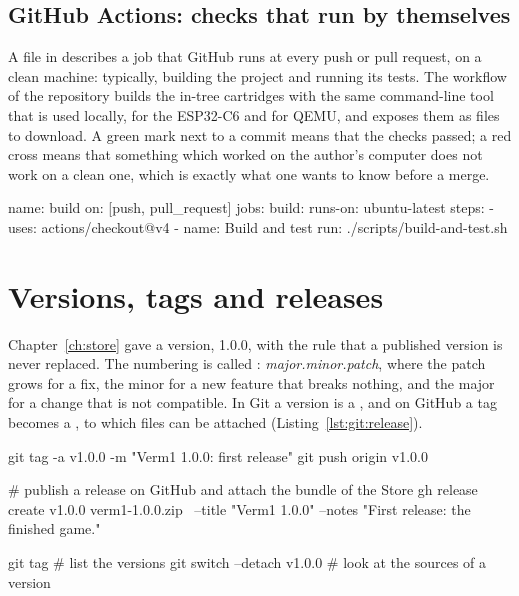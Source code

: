 \subsection{GitHub Actions: checks that run by themselves}

A file in  describes a job that GitHub runs at every
push or pull request, on a clean machine: typically, building the project and
running its tests. The workflow of the \prg repository builds the in-tree
cartridges with the same command-line tool that is used locally, for the
ESP32-C6 and for QEMU, and exposes them as files to download. A green mark
next to a commit means that the checks passed; a red cross means that
something which worked on the author's computer does not work on a clean one,
which is exactly what one wants to know before a merge.

\begin{plain}[caption={The outline of a workflow file (YAML). The build step is
project-specific: for a cartridge it requires the ESP-IDF toolchain.},label=lst:git:actions]
name: build
on: [push, pull_request]
jobs:
  build:
    runs-on: ubuntu-latest
    steps:
      - uses: actions/checkout@v4
      - name: Build and test
        run: ./scripts/build-and-test.sh
\end{plain}

\section{Versions, tags and releases}\label{sec:git:release}

Chapter~\ref{ch:store} gave \vermone a version, 1.0.0, with the rule that a
published version is never replaced. The numbering is called : \emph{major.minor.patch}, where the patch grows for a fix, the
minor for a new feature that breaks nothing, and the major for a change that
is not compatible. In Git a version is a , and on GitHub a tag
becomes a , to which files can be attached
(Listing~\ref{lst:git:release}).

\begin{shell}[caption={Tagging version 1.0.0 and releasing the bundle.},label=lst:git:release]
git tag -a v1.0.0 -m "Verm1 1.0.0: first release"
git push origin v1.0.0

# publish a release on GitHub and attach the bundle of the Store
gh release create v1.0.0 verm1-1.0.0.zip \
    --title "Verm1 1.0.0" --notes "First release: the finished game."

git tag                 # list the versions
git switch --detach v1.0.0   # look at the sources of a version
\end{shell}

